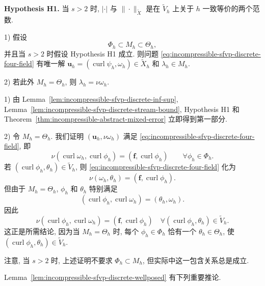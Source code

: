 \medskip
\noindent\textbf{Hypothesis H1.}
当 $s>2$ 时, $|\cdot|$ 与 $\|\cdot\|_{\widetilde X}$
是在 $\widetilde V_h$ 上关于 $h$ 一致等价的两个范数.

\begin{Lemma}\label{lem:incompressible-sfvp-discrete-wellposed}
\textup{1)} 假设
\begin{equation}\label{eq:incompressible-sfvp-space-inclusions}
\Phi_h\subset M_h\subset\Theta_h,
\end{equation}
并且当 $s>2$ 时假设 Hypothesis H1 成立.
则问题 \eqref{eq:incompressible-sfvp-discrete-four-field}
有唯一解
$\mathbf u_h=(\operatorname{curl}\psi_h,\omega_h)
\in\widetilde X_h$ 和 $\lambda_h\in M_h$.

\textup{2)} 若此外 $M_h=\Theta_h$, 则 $\lambda_h=\nu\omega_h$.
\end{Lemma}

\begin{Proof}
\textup{1)} 由 Lemma~\ref{lem:incompressible-sfvp-discrete-inf-sup},
Lemma~\ref{lem:incompressible-sfvp-discrete-stream-bound}, Hypothesis H1
和 Theorem~\ref{thm:incompressible-abstract-mixed-error} 立即得到第一部分.

\textup{2)} 令 $M_h=\Theta_h$.
我们证明 $(\mathbf u_h,\nu\omega_h)$
满足 \eqref{eq:incompressible-sfvp-discrete-four-field}, 即
\[
\nu(\operatorname{curl}\omega_h,\operatorname{curl}\phi_h)
=(\mathbf f,\operatorname{curl}\phi_h)
\qquad\forall\phi_h\in\Phi_h.
\]
若 $(\operatorname{curl}\phi_h,\theta_h)\in\widetilde V_h$,
则 \eqref{eq:incompressible-sfvp-discrete-four-field} 化为
\[
\nu(\omega_h,\theta_h)
=(\mathbf f,\operatorname{curl}\phi_h).
\]
但由于 $M_h=\Theta_h$, $\phi_h$ 和 $\theta_h$ 特别满足
\[
(\operatorname{curl}\phi_h,\operatorname{curl}\omega_h)
=(\theta_h,\omega_h).
\]
因此
\[
\nu(\operatorname{curl}\phi_h,\operatorname{curl}\omega_h)
=(\mathbf f,\operatorname{curl}\phi_h)
\quad
\forall(\operatorname{curl}\phi_h,\theta_h)\in\widetilde V_h.
\]
这正是所需结论, 因为当 $M_h=\Theta_h$ 时,
每个 $\phi_h\in\Phi_h$ 恰有一个 $\theta_h\in\Theta_h$,
使 $(\operatorname{curl}\phi_h,\theta_h)\in\widetilde V_h$.
\end{Proof}

注意, 当 $s>2$ 时, 上述证明不要求 $\Phi_h\subset M_h$,
但实际中这一包含关系总是成立.

Lemma~\ref{lem:incompressible-sfvp-discrete-wellposed}
有下列重要推论.

